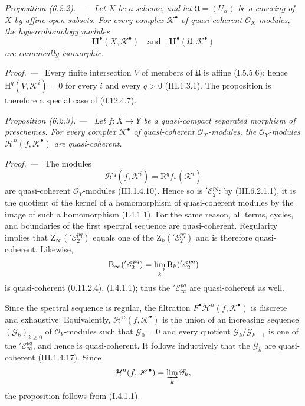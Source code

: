 \documentclass[10pt,oneside]{book}
\newcommand{\sh}[1]{\mathscr{#1}}
\newcommand{\RR}{\mathrm R}
\newcommand{\HH}{\mathrm H}
\newcommand{\sref}[2][]{(#2)}
\newenvironment{proposition}[1][]{\par\medskip\noindent\itshape Proposition (#1). ---\ }{\par}
\newenvironment{proof}{\par\medskip\noindent\textit{Proof. ---\ }}{\par}
\begin{document}
\begin{proposition}[6.2.2]
\label{III.6.2.2}
Let $X$ be a scheme, and let $\mathfrak{U}=(U_\alpha)$ be a
covering of $X$ by affine open subsets.  For every complex
$\sh{K}^\bullet$ of quasi-coherent $\sh{O}_X$-modules, the
hypercohomology modules
\[
  \mathbf{H}^\bullet(X,\sh{K}^\bullet)
  \quad\text{and}\quad
  \mathbf{H}^\bullet(\mathfrak{U},\sh{K}^\bullet)
\]
are canonically isomorphic.
\end{proposition}

\begin{proof}
Every finite intersection $V$ of members of $\mathfrak{U}$ is
affine \sref[I]{I.5.5.6}; hence
$\HH^q(V,\sh{K}^i)=0$ for every $i$ and every $q>0$
\sref{III.1.3.1}.  The proposition is therefore a special case of
\sref[0]{0.12.4.7}.
\end{proof}

\begin{proposition}[6.2.3]
\label{III.6.2.3}
Let $f:X\to Y$ be a quasi-compact separated morphism of
preschemes.  For every complex $\sh{K}^\bullet$ of quasi-coherent
$\sh{O}_X$-modules, the $\sh{O}_Y$-modules
$\mathcal{H}^n(f,\sh{K}^\bullet)$ are quasi-coherent.
\end{proposition}

\begin{proof}
The modules
\[
  \sh{H}^q(f,\sh{K}^i)=\RR^qf_*(\sh{K}^i)
\]
are quasi-coherent $\sh{O}_Y$-modules \sref{III.1.4.10}.  Hence so
is $'\sh{E}_2^{pq}$: by \sref{III.6.2.1.1}, it is the quotient of
the kernel of a homomorphism of quasi-coherent modules by the image
of such a homomorphism \sref[I]{I.4.1.1}.  For the same reason, all
terms, cycles, and boundaries of the first spectral sequence are
quasi-coherent.  Regularity implies that
$\mathrm{Z}_\infty('\sh{E}_2^{pq})$ equals one of the
$\mathrm{Z}_k('\sh{E}_2^{pq})$ and is therefore quasi-coherent.
Likewise,
\[
  \mathrm{B}_\infty('\sh{E}_2^{pq})
  =
  \varinjlim_k\mathrm{B}_k('\sh{E}_2^{pq})
\]
is quasi-coherent \sref[0]{0.11.2.4}, \sref[I]{I.4.1.1}; thus the
$'\sh{E}_\infty^{pq}$ are quasi-coherent as well.

Since the spectral sequence is regular, the filtration
$F^\bullet\mathcal{H}^n(f,\sh{K}^\bullet)$ is discrete and
exhaustive.  Equivalently,
$\mathcal{H}^n(f,\sh{K}^\bullet)$ is the union of an increasing
sequence $(\sh{G}_k)_{k\geq0}$ of $\sh{O}_Y$-modules such that
$\sh{G}_0=0$ and every quotient
$\sh{G}_k/\sh{G}_{k-1}$ is one of the
$'\sh{E}_\infty^{pq}$, and hence is quasi-coherent.  It follows
inductively that the $\sh{G}_k$ are quasi-coherent
\sref{III.1.4.17}.  Since
\[
  \mathcal{H}^n(f,\sh{K}^\bullet)
  =
  \varinjlim_k\sh{G}_k,
\]
the proposition follows from \sref[I]{I.4.1.1}.
\end{proof}
\end{document}
